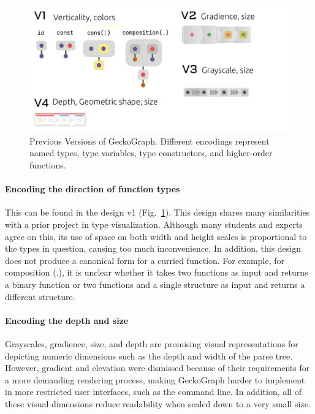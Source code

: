 \begin{figure}[hbt]
  \includegraphics[width=\linewidth]{figures/PreviousVersions}
  \caption[Previous Versions of GeckoGraph]{\label{fig:previous}Previous Versions of GeckoGraph. Different encodings represent named types, type variables, type constructors, and higher-order functions.}
\end{figure}

 
\paragraph{\textbf{Encoding the direction of function types}}
This can be found in the design v1 (Fig.~\ref{fig:previous}). This design shares many similarities with a prior project \cite{Jung2000-oc} in type visualization. Although many students and experts agree on this, its use of space on both width and height scales is proportional to the types in question, causing too much inconvenience. In addition, this design does not produce a canonical form for a curried function. For example, for composition (.), it is unclear whether it takes two functions as input and returns a binary function or two functions and a single structure as input and returns a different structure.

\paragraph{Encoding the depth and size} Grayscales, gradience, size, and depth are promising visual representations for depicting numeric dimensions such as the depth and width of the parse tree. However, gradient and elevation were dismissed because of their requirements for a more demanding rendering process, making GeckoGraph harder to implement in more restricted user interfaces, such as the command line. In addition, all of these visual dimensions reduce readability when scaled down to a very small size.

